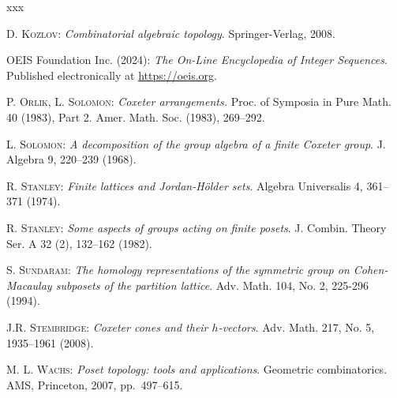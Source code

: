 \documentclass[11pt]{article}
\theoremstyle{definition}
\begin{document}
\begin{thebibliography}{xxx}

    
    \textsc{D. Kozlov}:
    {\it Combinatorial algebraic topology}.
    Springer-Verlag, 2008.    

    OEIS Foundation Inc. (2024):
    {\it The On-Line Encyclopedia of Integer Sequences}. 
    Published electronically at \url{https://oeis.org}.

 \textsc{P. Orlik, L. Solomon}:
 {\it Coxeter arrangements.}
 Proc. of Symposia in Pure Math. 40 (1983), Part 2.  Amer. Math. Soc. (1983), 269--292.




    \textsc{L. Solomon}: 
    {\it A decomposition of the group algebra of a finite Coxeter group}.
    J. Algebra 9, 220--239 (1968).

 
    \textsc{R. Stanley}:
    {\it Finite lattices and {J}ordan-{H}\"older sets}.
    Algebra Universalis 4, 361--371 (1974).

    \textsc{R. Stanley}:
    {\it Some aspects of groups acting on finite posets}.
    J. Combin. Theory Ser. A 32 (2), 132--162 (1982).

    \textsc{S. Sundaram}:
    {\it The homology representations of the symmetric group on
Cohen-Macaulay subposets of the partition lattice}.
    Adv. Math. 104, No. 2, 225-296 (1994).

    \textsc{J.R. Stembridge}:
    {\it Coxeter cones and their {$h$}-vectors}.
    Adv. Math. 217, No. 5, 1935--1961 (2008).
   
    \textsc{M. L. Wachs}:
    {\it Poset topology: tools and applications}.
    Geometric combinatorics.  AMS, Princeton, 2007, pp.~497--615. %
    
\end{thebibliography}
\end{document}
